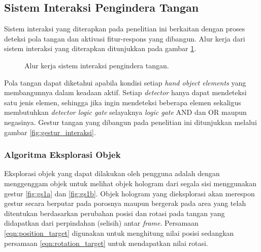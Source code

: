 \documentclass[conference]{IEEEtran}
\begin{document}
	\subsection{Sistem Interaksi Pengindera Tangan}
		Sistem interaksi yang diterapkan pada penelitian ini berkaitan dengan proses deteksi pola tangan dan aktivasi fitur-respons yang dibangun. Alur kerja dari sistem interaksi yang diterapkan ditunjukkan pada gambar \ref{fig:desain_interaksi}.
		\vspace{-2ex}
		\begin{figure}[h]
			\caption{Alur kerja sistem interaksi pengindera tangan.}
			\label{fig:desain_interaksi}
		\end{figure}
		\vspace{-2ex}
		
		Pola tangan dapat diketahui apabila kondisi setiap \textit{hand object elements} yang membangunnya dalam keadaan aktif. Setiap \textit{detector} hanya dapat mendeteksi satu jenis elemen, sehingga jika ingin mendeteksi beberapa elemen sekaligus membutuhkan \textit{detector logic gate} selayaknya \textit{logic gate} AND dan OR maupun negasinya. Gestur tangan yang dibangun pada penelitian ini ditunjukkan melalui gambar \ref{fig:gestur_interaksi}.
		
		\subsubsection{Algoritma Eksplorasi Objek}
			Eksplorasi objek yang dapat dilakukan oleh pengguna adalah dengan menggenggam objek untuk melihat objek hologram dari segala sisi menggunakan gestur \ref{fig:gs1a} dan \ref{fig:gs1b}. Objek hologram yang dieksplorasi akan merespon gestur secara berputar pada porosnya maupun bergerak pada area yang telah ditentukan berdasarkan perubahan posisi dan rotasi pada tangan yang didapatkan dari perpindahan (selisih) antar \textit{frame}. Persamaan \ref{eqn:position_target} digunakan untuk menghitung nilai posisi sedangkan persamaan \ref{eqn:rotation_target} untuk mendapatkan nilai rotasi.
			
\end{document}
